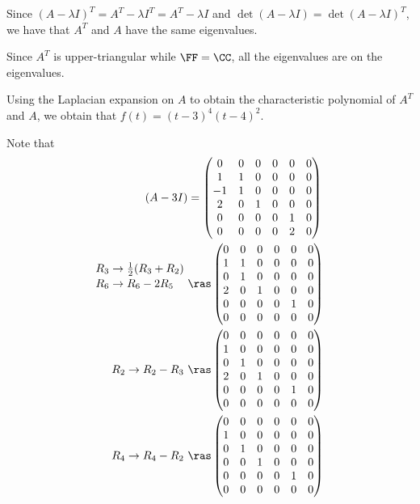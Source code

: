 \documentclass[11pt]{scrartcl}
\begin{document}
\begin{soln}
  \hfill

  Since $(A-\lambda I)^T = A^T - \lambda I^T = A^T - \lambda I$ and $\det(A-\lambda I) = \det(A-\lambda I)^T$, we have that $A^T$ and $A$ have the same eigenvalues.

  Since $A^T$ is upper-triangular while $\FF = \CC$, all the
  eigenvalues are on the eigenvalues.

  Using the Laplacian expansion on $A$ to obtain the characteristic
  polynomial of $A^T$ and $A$, we obtain that $f(t) = (t-3)^4(t-4)^2$.

  Note that 
  \begin{align}
(A-3I) &= 
  \begin{pmatrix}
    0  & 0 & 0 & 0 & 0 & 0 \\
    1  & 1 & 0 & 0 & 0 & 0 \\
    -1 & 1 & 0 & 0 & 0 & 0 \\
    2  & 0 & 1 & 0 & 0 & 0 \\
    0  & 0 & 0 & 0 & 1 & 0 \\
    0  & 0 & 0 & 0 & 2 & 0
  \end{pmatrix}\\
    \shortstack[l]{
$R_3 \to \frac{1}{2}(R_3+R_2)$ \\
$R_6 \to R_6-2R_{5}$}
\ &\ras 
  \begin{pmatrix}
    0  & 0 & 0 & 0 & 0 & 0 \\
    1  & 1 & 0 & 0 & 0 & 0 \\
    0 & 1 & 0 & 0 & 0 & 0 \\
    2  & 0 & 1 & 0 & 0 & 0 \\
    0  & 0 & 0 & 0 & 1 & 0 \\
    0  & 0 & 0 & 0 & 0 & 0
  \end{pmatrix}\\
R_2\to R_2-R_{3}
\ &\ras 
  \begin{pmatrix}
    0  & 0 & 0 & 0 & 0 & 0 \\
    1  & 0 & 0 & 0 & 0 & 0 \\
    0 & 1 & 0 & 0 & 0 & 0 \\
    2  & 0 & 1 & 0 & 0 & 0 \\
    0  & 0 & 0 & 0 & 1 & 0 \\
    0  & 0 & 0 & 0 & 0 & 0
  \end{pmatrix}\\
R_4\to R_4-R_{2}
\ &\ras 
  \begin{pmatrix}
    0  & 0 & 0 & 0 & 0 & 0 \\
    1  & 0 & 0 & 0 & 0 & 0 \\
    0 & 1 & 0 & 0 & 0 & 0 \\
    0  & 0 & 1 & 0 & 0 & 0 \\
    0  & 0 & 0 & 0 & 1 & 0 \\
    0  & 0 & 0 & 0 & 0 & 0
  \end{pmatrix}
\label{eq:1}
  \end{align}


\end{soln}
\end{document}
